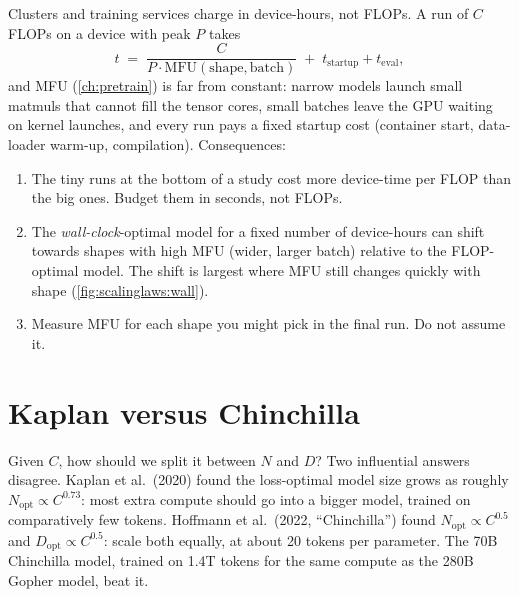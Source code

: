 \begin{systemslens}
Clusters and training services charge in device-hours, not FLOPs. A run of $C$ FLOPs on a
device with peak $P$ takes
\[
t \;=\; \frac{C}{P\cdot\mathrm{MFU}(\text{shape},\text{batch})} \;+\; t_{\text{startup}} + t_{\text{eval}},
\]
and MFU (\cref{ch:pretrain}) is far from constant: narrow models launch small matmuls that cannot
fill the tensor cores, small batches leave the GPU waiting on kernel launches, and every run pays
a fixed startup cost (container start, data-loader warm-up, compilation). Consequences:
\begin{enumerate}
\item The tiny runs at the bottom of a study cost more device-time per FLOP than the big ones.
      Budget them in seconds, not FLOPs.
\item The \emph{wall-clock}-optimal model for a fixed number of device-hours can shift
      towards shapes with high MFU (wider, larger batch) relative to the FLOP-optimal model.
      The shift is largest where MFU still changes quickly with shape
      (\cref{fig:scalinglaws:wall}).
\item Measure MFU for each shape you might pick in the final run. Do not assume it.
\end{enumerate}
\end{systemslens}

\section{Kaplan versus Chinchilla}\label{sec:scalinglaws:kaplan}

Given $C$, how should we split it between $N$ and $D$? Two influential answers disagree.
Kaplan et al.\ (2020) found the loss-optimal model size grows as roughly $N_{\text{opt}}\propto
C^{0.73}$: most extra compute should go into a bigger model, trained on comparatively few
tokens. Hoffmann et al.\ (2022, ``Chinchilla'') found $N_{\text{opt}}\propto C^{0.5}$ and
$D_{\text{opt}}\propto C^{0.5}$: scale both equally, at about 20 tokens per parameter. The 70B
Chinchilla model, trained on 1.4T tokens for the same compute as the 280B Gopher model, beat it.

